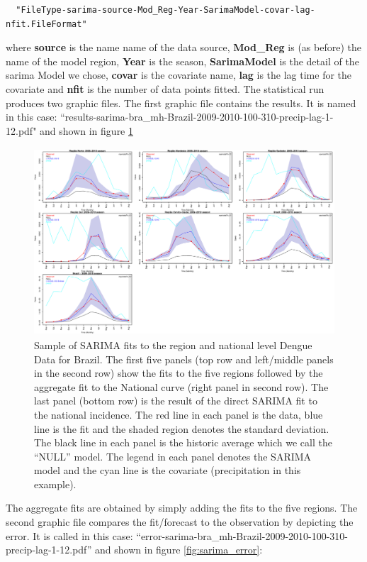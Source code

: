 \documentclass[a4paper]{article}
\begin{document}
\begin{verbatim}
  "FileType-sarima-source-Mod_Reg-Year-SarimaModel-covar-lag-nfit.FileFormat"
\end{verbatim}
where \textbf{source} is the name name of the data source, \textbf{Mod\_Reg} is (as before) the name of the model region, \textbf{Year} is the season, \textbf{SarimaModel} is the detail of the sarima Model we chose, \textbf{covar} is the covariate name, \textbf{lag} is the lag time for the covariate and \textbf{nfit} is the number of data points fitted. The statistical run produces two graphic files. The first graphic file contains the results.  It is named in this case: ``results-sarima-bra\_mh-Brazil-2009-2010-100-310-precip-lag-1-12.pdf" and shown in figure \ref{fig:sarima_results}
\begin{figure}[htbp]
  \centering
  \includegraphics[height=2.75in,keepaspectratio]{figures/sarima_results.pdf}
  \hspace{0.4in}
  \caption{Sample of SARIMA fits to the region and national level Dengue Data for Brazil. The first five panels (top row and left/middle panels in the second row) show the fits to the five regions followed by the aggregate fit to the National curve (right panel in second row). The last panel (bottom row) is the result of the direct SARIMA fit to the national incidence. The red line in each panel is the data, blue line is the fit and the shaded region denotes the standard deviation.  The black line in each panel is the historic average which we call the ``NULL'' model. The legend in each panel denotes the SARIMA model and the cyan line is the covariate (precipitation in this example).}
  \label{fig:sarima_results}
\end{figure}

The aggregate fits are obtained by simply adding the fits to the five regions.
The second graphic file compares the fit/forecast to the observation by depicting the error. It is called in this case:
``error-sarima-bra\_mh-Brazil-2009-2010-100-310-precip-lag-1-12.pdf'' and shown in figure \ref{fig:sarima_error}:
\end{document}
